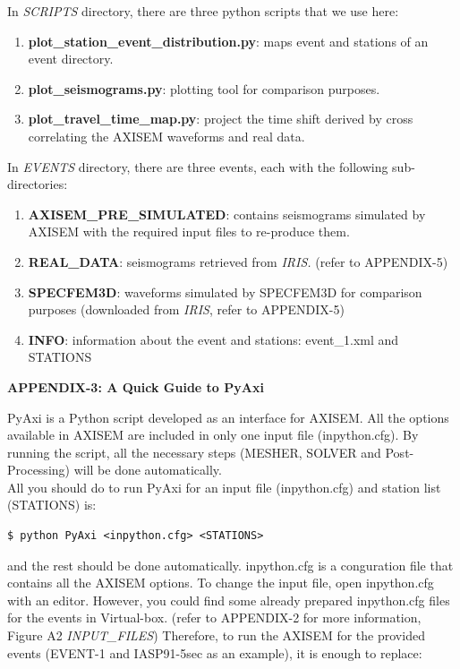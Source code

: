\documentclass{article}
\begin{document}
In \textit{SCRIPTS} directory, there are three python scripts that we use here:

\begin{enumerate}
 \item \textbf{plot\_station\_event\_distribution.py}: maps event and stations of an event directory.
 \item \textbf{plot\_seismograms.py}: plotting tool for comparison purposes.
 \item \textbf{plot\_travel\_time\_map.py}: project the time shift derived by cross correlating the AXISEM waveforms and real data.
\end{enumerate}

In \textit{EVENTS} directory, there are three events, each with the following sub-directories:

\begin{enumerate}
 \item \textbf{AXISEM\_PRE\_SIMULATED}: contains seismograms simulated by AXISEM with 
the required input files to re-produce them.
 \item \textbf{REAL\_DATA}: seismograms retrieved from \textit{IRIS. }(refer to APPENDIX-5)
 \item \textbf{SPECFEM3D}: waveforms simulated by SPECFEM3D for comparison purposes 
(downloaded from\textit{ IRIS}, refer to APPENDIX-5)
 \item \textbf{INFO}: information about the event and stations: event\_1.xml and STATIONS
\end{enumerate}


\newpage
{\large{}\textbf{APPENDIX-3: A Quick Guide to PyAxi}}

PyAxi is a Python script developed as an interface for AXISEM. All the options 
available in AXISEM are included in only one input file (inpython.cfg). By running 
the script, all the necessary steps (MESHER, SOLVER and Post-Processing) will be 
done automatically. \\

All you should do to run PyAxi for an input file (inpython.cfg) and station list 
(STATIONS) is:
\begin{verbatim}
$ python PyAxi <inpython.cfg> <STATIONS>
\end{verbatim}

and the rest should be done automatically. inpython.cfg is a conguration file that 
contains all the AXISEM options. To change the input file, open inpython.cfg with 
an editor. However, you could find some already prepared inpython.cfg files for 
the events in Virtual-box. (refer to APPENDIX-2 for more information, Figure A2 
\textit{INPUT\_FILES}) Therefore, to run the AXISEM for the provided events (EVENT-1 
and IASP91-5sec as an example), it is enough to replace:
\end{document}
